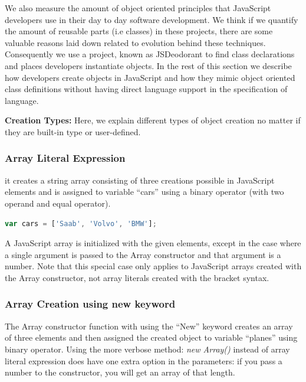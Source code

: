We also measure the amount of object oriented principles that JavaScript developers use in their day to day software development. We think if we quantify the amount of reusable parts (i.e classes) in these projects, there are some valuable reasons laid down related to evolution behind these techniques. Consequently we use a project, known as JSDeodorant to find class declarations and places developers instantiate objects.
In the rest of this section we describe how developers create objects in JavaScript and how they mimic object oriented class definitions without having direct language support in the specification of language.

\noindent\textbf{Creation Types:} Here, we explain different types of object creation no matter if they are built-in type or user-defined. 

\medskip
\noindent\subsubsection{Array Literal Expression}

it creates a string array consisting of three creations possible in JavaScript elements and is assigned to variable “cars” using a binary operator (with two operand and equal operator). 
\medskip
\begin{lstlisting}[caption={Array literal expression},label={lst:array_literal},language=JavaScript]
var cars = ['Saab', 'Volvo', 'BMW'];
\end{lstlisting}
A JavaScript array is initialized with the given elements, except in the case where a single argument is passed to the Array constructor and that argument is a number. Note that this special case only applies to JavaScript arrays created with the Array constructor, not array literals created with the bracket syntax.
\\
\noindent\subsubsection{Array Creation using \textbf{new} keyword}

The Array constructor function with using the “New” keyword creates an array of three elements and then assigned the created object to variable “planes” using binary operator. Using the more verbose method: \textit{new Array()} instead of array literal expression does have one extra option in the parameters: if you pass a number to the constructor, you will get an array of that length. 

